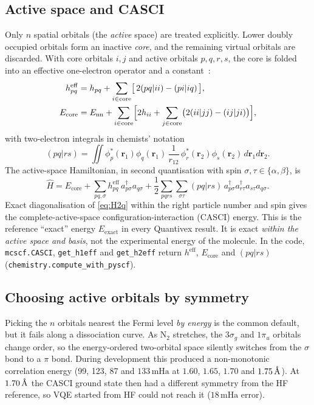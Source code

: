 \documentclass[10pt,a4paper]{article}
\newcommand{\mHa}{\,\mathrm{mHa}}
\newcommand{\Ang}{\ensuremath{\,\text{\normalfont\AA}}}
\newcommand{\cre}[1]{a^{\dagger}_{#1}}
\newcommand{\ann}[1]{a_{#1}}
\newcommand{\code}[1]{\texttt{\small #1}}
\begin{document}
\subsection{Active space and CASCI}
Only $n$ spatial orbitals (the \emph{active} space) are treated explicitly. Lower doubly occupied orbitals form an inactive \emph{core}, and the remaining virtual orbitals are discarded. With core orbitals $i,j$ and active orbitals $p,q,r,s$, the core is folded into an effective one-electron operator and a constant~\cite{Helgaker2000}:
\begin{align}
h^{\mathrm{eff}}_{pq} &= h_{pq} + \sum_{i\in\mathrm{core}} \bigl[\,2(pq|ii)-(pi|iq)\,\bigr],\\
E_{\mathrm{core}} &= E_{\mathrm{nn}} + \sum_{i\in\mathrm{core}}\Bigl[2h_{ii}+\sum_{j\in\mathrm{core}}\bigl(2(ii|jj)-(ij|ji)\bigr)\Bigr],
\end{align}
with two-electron integrals in chemists' notation
\begin{equation}
(pq|rs)=\iint \phi_p^*(\mathbf r_1)\phi_q(\mathbf r_1)\,\frac{1}{r_{12}}\,\phi_r^*(\mathbf r_2)\phi_s(\mathbf r_2)\,d\mathbf r_1 d\mathbf r_2 .
\end{equation}
The active-space Hamiltonian, in second quantisation with spin $\sigma,\tau\in\{\alpha,\beta\}$, is
\begin{equation}\label{eq:H2q}
\hat H = E_{\mathrm{core}} + \sum_{pq,\sigma} h^{\mathrm{eff}}_{pq}\,\cre{p\sigma}\ann{q\sigma} + \frac12\sum_{pqrs}\sum_{\sigma\tau}(pq|rs)\,\cre{p\sigma}\cre{r\tau}\ann{s\tau}\ann{q\sigma}.
\end{equation}
Exact diagonalisation of \eqref{eq:H2q} within the right particle number and spin gives the complete-active-space configuration-interaction (CASCI) energy. This is the reference ``exact'' energy $E_{\mathrm{exact}}$ in every Quantivex result. It is exact \emph{within the active space and basis}, not the experimental energy of the molecule. In the code, \code{mcscf.CASCI}, \code{get\_h1eff} and \code{get\_h2eff} return $h^{\mathrm{eff}}$, $E_{\mathrm{core}}$ and $(pq|rs)$ (\code{chemistry.compute\_with\_pyscf}).

\subsection{Choosing active orbitals by symmetry}\label{sec:irreps}
Picking the $n$ orbitals nearest the Fermi level \emph{by energy} is the common default, but it fails along a dissociation curve. As N$_2$ stretches, the $3\sigma_g$ and $1\pi_u$ orbitals change order, so the energy-ordered two-orbital space silently switches from the $\sigma$ bond to a $\pi$ bond. During development this produced a non-monotonic correlation energy (99, 123, 87 and $133\mHa$ at $1.60$, $1.65$, $1.70$ and $1.75\Ang$). At $1.70\Ang$ the CASCI ground state then had a different symmetry from the HF reference, so VQE started from HF could not reach it ($18\mHa$ error).
\end{document}
